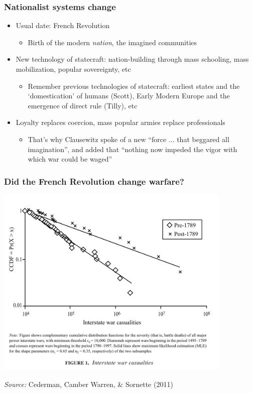 \documentclass[aspectratio=43, handout]{beamer}
\begin{document}
\begin{frame}
\frametitle{Nationalist systems change}
\centering

\begin{itemize}
  \item Usual date: French Revolution
  \begin{itemize}
    \item Birth of the modern \textit{nation}, the imagined communities
  \end{itemize}
  \item New technology of statecraft: nation-building through mass schooling, mass mobilization, popular sovereignty, etc
  \begin{itemize}
    \item Remember previous technologies of statecraft: earliest states and the `domestication' of humans (Scott), Early Modern Europe and the emergence of direct rule (Tilly), etc
  \end{itemize}
  \item Loyalty replaces coercion, mass popular armies replace professionals
  \begin{itemize}
    \item That's why Clausewitz spoke of a new ``force ... that beggared all imagination'', and added that ``nothing now impeded the vigor with which war could be waged''
  \end{itemize}
\end{itemize}

\end{frame}

\begin{frame}
\frametitle{Did the French Revolution change warfare?}
\centering

\includegraphics[width = 0.85\textwidth]{img/cederman_et_al_fig1}

{\scriptsize \textit{Source:} Cederman, Camber Warren, \& Sornette (2011)}

\end{frame}
\end{document}

